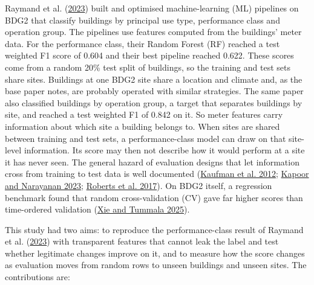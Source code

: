 \documentclass[
  10pt,
]{article}
\begin{document}
Raymand et al. (\protect\hyperlink{ref-raymand2023}{2023}) built and
optimised machine-learning (ML) pipelines on BDG2 that classify
buildings by principal use type, performance class and operation group.
The pipelines use features computed from the buildings' meter data. For
the performance class, their Random Forest (RF) reached a test weighted
F1 score of 0.604 and their best pipeline reached 0.622. These scores
come from a random 20\% test split of buildings, so the training and
test sets share sites. Buildings at one BDG2 site share a location and
climate and, as the base paper notes, are probably operated with similar
strategies. The same paper also classified buildings by operation group,
a target that separates buildings by site, and reached a test weighted
F1 of 0.842 on it. So meter features carry information about which site
a building belongs to. When sites are shared between training and test
sets, a performance-class model can draw on that site-level information.
Its score may then not describe how it would perform at a site it has
never seen. The general hazard of evaluation designs that let
information cross from training to test data is well documented
(\protect\hyperlink{ref-kaufman2012}{Kaufman et al. 2012};
\protect\hyperlink{ref-kapoor2023}{Kapoor and Narayanan 2023};
\protect\hyperlink{ref-roberts2017}{Roberts et al. 2017}). On BDG2
itself, a regression benchmark found that random cross-validation (CV)
gave far higher scores than time-ordered validation
(\protect\hyperlink{ref-xie2025}{Xie and Tummala 2025}).

This study had two aims: to reproduce the performance-class result of
Raymand et al. (\protect\hyperlink{ref-raymand2023}{2023}) with
transparent features that cannot leak the label and test whether
legitimate changes improve on it, and to measure how the score changes
as evaluation moves from random rows to unseen buildings and unseen
sites. The contributions are:
\end{document}
